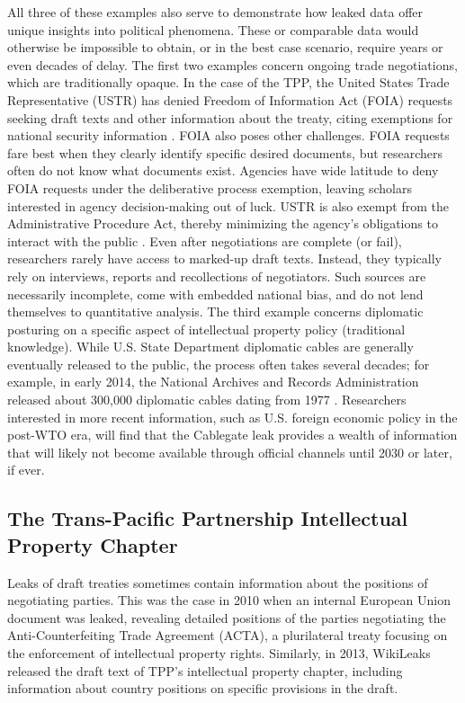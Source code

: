 \documentclass[12pt]{article}
\begin{document}
All three of these examples also serve to demonstrate how leaked data offer unique insights into 
political phenomena. These or comparable data would otherwise be impossible to obtain, or in the best case scenario, 
require years or even decades of delay. The first two examples concern ongoing trade negotiations, 
which are traditionally opaque. In the case of the TPP, the United States Trade Representative (USTR) has denied 
Freedom of Information Act (FOIA) requests seeking draft texts and other information about the treaty, citing exemptions 
for national security information \citep{levine2012bring}. FOIA also poses other challenges. FOIA requests 
fare best when they clearly identify specific desired documents, but researchers often do not know what documents exist. 
Agencies have wide latitude to deny FOIA requests under the deliberative process exemption, leaving scholars 
interested in agency decision-making out of luck.
USTR is also exempt from the Administrative Procedure Act, thereby minimizing 
the agency's obligations to interact with the public \citep{kaminski2014capture}.
Even after negotiations are complete (or fail), researchers rarely have 
access to marked-up draft texts. Instead, they typically rely on interviews, reports and recollections of 
negotiators.
Such sources are necessarily incomplete, come with embedded national bias, and do not lend themselves 
to quantitative analysis. The third example concerns diplomatic posturing on a specific aspect of 
intellectual property policy (traditional knowledge). While U.S. State Department diplomatic cables are generally eventually released to the public, the process often takes several decades; for example, in early 2014, the National Archives and Records Administration 
released about 300,000 diplomatic cables dating from 1977 \citep{national_security_archive2014u.s.}. 
Researchers interested in more recent information, 
such as U.S. foreign economic policy in the post-WTO era, will find that the Cablegate leak provides a wealth of 
information that will likely not become available through official channels until 2030 or later, if ever.

\subsection*{The Trans-Pacific Partnership Intellectual Property Chapter}
\label{tpp_ip}

Leaks of draft treaties sometimes contain information about the positions 
of negotiating parties. This was the case in 2010 when an internal European Union document was 
leaked, revealing detailed positions of the parties negotiating the Anti-Counterfeiting 
Trade Agreement (ACTA), a plurilateral treaty focusing on the enforcement of intellectual property 
rights. Similarly, in 2013, WikiLeaks released the draft text of TPP's intellectual property chapter, 
including information about country positions on specific provisions in the draft.
\end{document}
